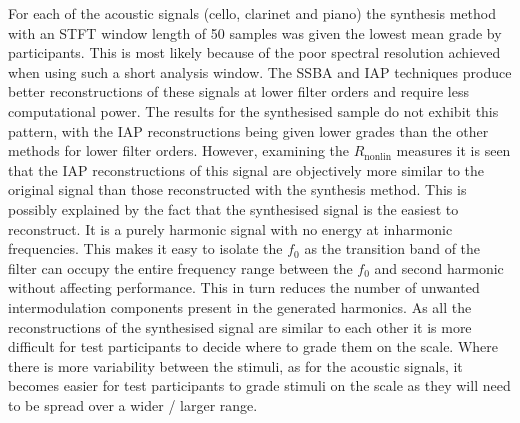		For each of the acoustic signals (cello, clarinet and piano) the synthesis method with an STFT window
		length of 50 samples was given the lowest mean grade by participants. This is most likely because of the
		poor spectral resolution achieved when using such a short analysis window. The SSBA and IAP techniques
		produce better reconstructions of these signals at lower filter orders and require less computational
		power. The results for the synthesised sample do not exhibit this pattern, with the IAP reconstructions
		being given lower grades than the other methods for lower filter orders. However, examining the
		$R_{\mathrm{nonlin}}$ measures it is seen that the IAP reconstructions of this signal are objectively more
		similar to the original signal than those reconstructed with the synthesis method. This is possibly
		explained by the fact that the synthesised signal is the easiest to reconstruct. It is a purely harmonic
		signal with no energy at inharmonic frequencies. This makes it easy to isolate the $f_{0}$ as the
		transition band of the filter can occupy the entire frequency range between the $f_{0}$ and second harmonic
		without affecting performance. This in turn reduces the number of unwanted intermodulation components
		present in the generated harmonics. As all the reconstructions of the synthesised signal are similar to
		each other it is more difficult for test participants to decide where to grade them on the scale. Where
		there is more variability between the stimuli, as for the acoustic signals, it becomes easier for test
		participants to grade stimuli on the scale as they will need to be spread over a wider / larger range.

